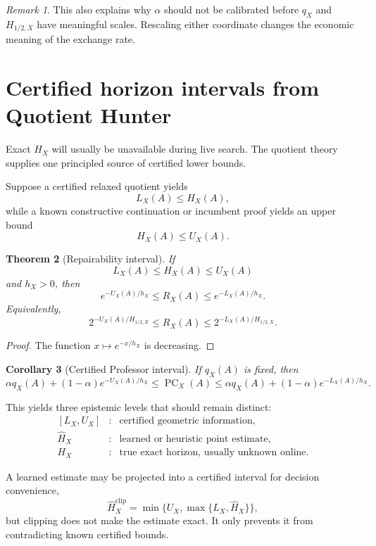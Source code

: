 \documentclass[11pt]{article}
\newtheorem{theorem}{Theorem}[section]
\newtheorem{corollary}[theorem]{Corollary}
\theoremstyle{definition}
\theoremstyle{remark}
\newtheorem{remark}[theorem]{Remark}
\newcommand{\PC}{\operatorname{PC}}
\begin{document}
\begin{remark}
This also explains why $\alpha$ should not be calibrated before $q_X$ and $H_{1/2,X}$ have meaningful scales. Rescaling either coordinate changes the economic meaning of the exchange rate.
\end{remark}

\section{Certified horizon intervals from Quotient Hunter}

Exact $H_X$ will usually be unavailable during live search. The quotient theory~\cite{quotient} supplies one principled source of certified lower bounds.

Suppose a certified relaxed quotient yields
\[
L_X(A)\le H_X(A),
\]
while a known constructive continuation or incumbent proof yields an upper bound
\[
H_X(A)\le U_X(A).
\]

\begin{theorem}[Repairability interval]
If
\[
L_X(A)\le H_X(A)\le U_X(A)
\]
and $h_X>0$, then
\[
\boxed{
 e^{-U_X(A)/h_X}
\le R_X(A)\le
 e^{-L_X(A)/h_X}.
}
\]
Equivalently,
\[
\boxed{
2^{-U_X(A)/H_{1/2,X}}
\le R_X(A)\le
2^{-L_X(A)/H_{1/2,X}}.
}
\]
\end{theorem}

\begin{proof}
The function $x\mapsto e^{-x/h_X}$ is decreasing.
\end{proof}

\begin{corollary}[Certified Professor interval]
If $q_X(A)$ is fixed, then
\[
\boxed{
\alpha q_X(A)+(1-\alpha)e^{-U_X(A)/h_X}
\le \PC_X(A)
\le
\alpha q_X(A)+(1-\alpha)e^{-L_X(A)/h_X}.
}
\]
\end{corollary}

This yields three epistemic levels that should remain distinct:
\[
\begin{array}{lll}
[L_X,U_X] &:& \text{certified geometric information},\\
\widehat H_X &:& \text{learned or heuristic point estimate},\\
H_X &:& \text{true exact horizon, usually unknown online}.
\end{array}
\]

A learned estimate may be projected into a certified interval for decision convenience,
\[
\widehat H_X^{\mathrm{clip}}
=\min\{U_X,\max\{L_X,\widehat H_X\}\},
\]
but clipping does not make the estimate exact. It only prevents it from contradicting known certified bounds.
\end{document}
